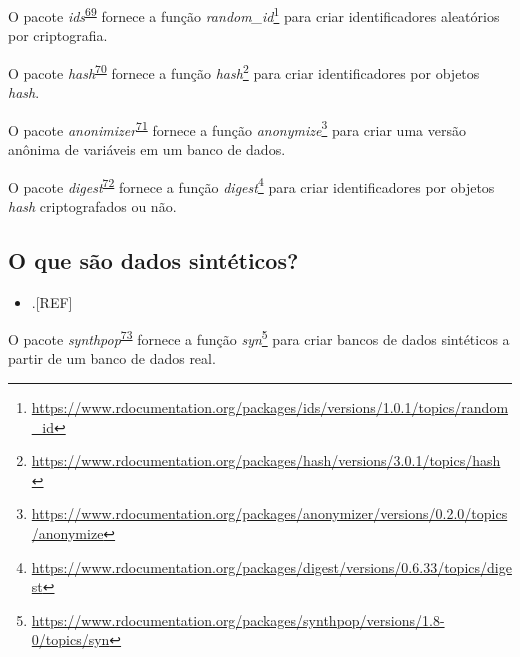 \documentclass[
  a4paper,
]{book}
\providecommand{\tightlist}{%
  \setlength{\itemsep}{0pt}\setlength{\parskip}{0pt}}
\renewcommand{\href}[2]{#2\footnote{\url{#1}}}
\newenvironment{infobox}[1]
  {
  \begin{itemize}
  \renewcommand{\labelitemi}{
    \raisebox{-.7\height}[0pt][0pt]{
      {\setkeys{Gin}{width=3em,keepaspectratio}
        \texttt{[image: \#1]}}
    }
  }
  \setlength{\fboxsep}{1em}
  \begin{blackbox}
  \item
  }
  {
  \end{blackbox}
  \end{itemize}
  }
\begin{document}
\begin{infobox}{images/Rlogo}
O pacote \emph{ids}\textsuperscript{\protect\hyperlink{ref-ids}{69}} fornece a função \href{https://www.rdocumentation.org/packages/ids/versions/1.0.1/topics/random_id}{\emph{random\_id}} para criar identificadores aleatórios por criptografia.

\end{infobox}

\begin{infobox}{images/Rlogo}
O pacote \emph{hash}\textsuperscript{\protect\hyperlink{ref-hash}{70}} fornece a função \href{https://www.rdocumentation.org/packages/hash/versions/3.0.1/topics/hash}{\emph{hash}} para criar identificadores por objetos \emph{hash}.

\end{infobox}

\begin{infobox}{images/Rlogo}
O pacote \emph{anonimizer}\textsuperscript{\protect\hyperlink{ref-anonymizer}{71}} fornece a função \href{https://www.rdocumentation.org/packages/anonymizer/versions/0.2.0/topics/anonymize}{\emph{anonymize}} para criar uma versão anônima de variáveis em um banco de dados.

\end{infobox}

\begin{infobox}{images/Rlogo}
O pacote \emph{digest}\textsuperscript{\protect\hyperlink{ref-digest}{72}} fornece a função \href{https://www.rdocumentation.org/packages/digest/versions/0.6.33/topics/digest}{\emph{digest}} para criar identificadores por objetos \emph{hash} criptografados ou não.

\end{infobox}

\hypertarget{o-que-suxe3o-dados-sintuxe9ticos}{%
\subsection{O que são dados sintéticos?}\label{o-que-suxe3o-dados-sintuxe9ticos}}

\begin{itemize}
\tightlist
\item
  .{[}REF{]}
\end{itemize}

\begin{infobox}{images/Rlogo}
O pacote \emph{synthpop}\textsuperscript{\protect\hyperlink{ref-synthpop}{73}} fornece a função \href{https://www.rdocumentation.org/packages/synthpop/versions/1.8-0/topics/syn}{\emph{syn}} para criar bancos de dados sintéticos a partir de um banco de dados real.

\end{infobox}
\end{document}
